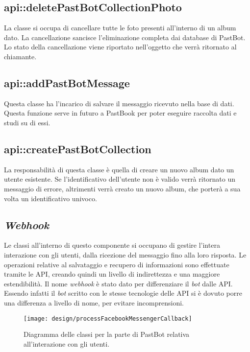 \subsection{api::deletePastBotCollectionPhoto}

La classe si occupa di cancellare tutte le foto presenti all'interno di un
album dato. La cancellazione sancisce l'eliminazione completa dai database di
PastBot.
Lo stato della cancellazione viene riportato nell'oggetto che verrà ritornato
al chiamante.

\subsection{api::addPastBotMessage}

Questa classe ha l'incarico di salvare il messaggio ricevuto nella base di
dati. Questa funzione serve in futuro a PastBook per poter eseguire raccolta
dati e studi su di essi.

\subsection{api::createPastBotCollection}

La responsabilità di questa classe è quella di creare un nuovo album dato un
utente esistente. Se l'identificativo dell'utente non è valido verrà ritornato
un messaggio di errore, altrimenti verrà creato un nuovo album, che porterà a
sua volta un identificativo univoco.

\subsection{\textit{Webhook}}

Le classi all'interno di questo componente si occupano di gestire l'intera
interazione con gli utenti, dalla ricezione del messaggio fino alla loro
risposta. Le operazioni relative al salvataggio e recupero di informazioni sono
effettuate tramite le API, creando quindi un livello di indirettezza e una
maggiore estendibilità.
Il nome \textit{webhook} è stato dato per differenziare il \textit{bot} dalle
API. Essendo infatti il \textit{bot} scritto con le stesse tecnologie delle API
si è dovuto porre una differenza a livello di nome, per evitare incomprensioni.

\begin{figure}[H]
  \centering
  \texttt{[image: design/processFacebookMessengerCallback]}
  \caption{Diagramma delle classi per la parte di PastBot relativa
all'interazione con gli utenti.}
\end{figure}

